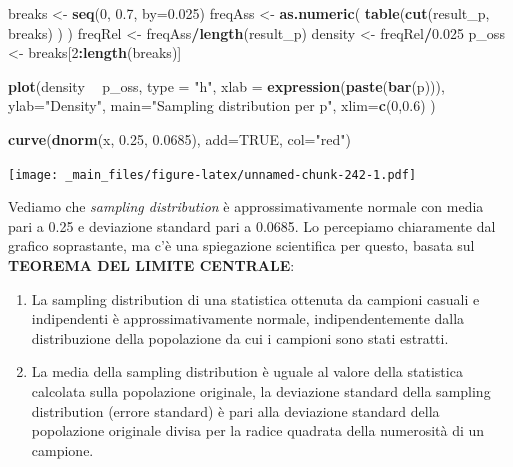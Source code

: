 \documentclass[a4paper,12pt,oneside]{book}
\providecommand{\tightlist}{%
  \setlength{\itemsep}{0pt}\setlength{\parskip}{0pt}}
\newenvironment{Shaded}{\begin{snugshade}}{\end{snugshade}}
\newcommand{\KeywordTok}[1]{\textcolor[rgb]{0.13,0.29,0.53}{\textbf{#1}}}
\newcommand{\DataTypeTok}[1]{\textcolor[rgb]{0.13,0.29,0.53}{#1}}
\newcommand{\DecValTok}[1]{\textcolor[rgb]{0.00,0.00,0.81}{#1}}
\newcommand{\FloatTok}[1]{\textcolor[rgb]{0.00,0.00,0.81}{#1}}
\newcommand{\StringTok}[1]{\textcolor[rgb]{0.31,0.60,0.02}{#1}}
\newcommand{\OtherTok}[1]{\textcolor[rgb]{0.56,0.35,0.01}{#1}}
\newcommand{\OperatorTok}[1]{\textcolor[rgb]{0.81,0.36,0.00}{\textbf{#1}}}
\newcommand{\NormalTok}[1]{#1}
\theoremstyle{definition}
\theoremstyle{definition}
\theoremstyle{definition}
\theoremstyle{remark}
\begin{document}
\begin{Shaded}
\begin{Highlighting}[]
\NormalTok{breaks <-}\StringTok{ }\KeywordTok{seq}\NormalTok{(}\DecValTok{0}\NormalTok{, }\FloatTok{0.7}\NormalTok{, }\DataTypeTok{by=}\FloatTok{0.025}\NormalTok{)}
\NormalTok{freqAss <-}\StringTok{ }\KeywordTok{as.numeric}\NormalTok{( }\KeywordTok{table}\NormalTok{(}\KeywordTok{cut}\NormalTok{(result_p, breaks) ) ) }
\NormalTok{freqRel <-}\StringTok{ }\NormalTok{freqAss}\OperatorTok{/}\KeywordTok{length}\NormalTok{(result_p)}
\NormalTok{density <-}\StringTok{ }\NormalTok{freqRel}\OperatorTok{/}\FloatTok{0.025}
\NormalTok{p_oss <-}\StringTok{ }\NormalTok{breaks[}\DecValTok{2}\OperatorTok{:}\KeywordTok{length}\NormalTok{(breaks)]}

\KeywordTok{plot}\NormalTok{(density }\OperatorTok{~}\StringTok{ }\NormalTok{p_oss, }\DataTypeTok{type =} \StringTok{"h"}\NormalTok{,}
     \DataTypeTok{xlab =} \KeywordTok{expression}\NormalTok{(}\KeywordTok{paste}\NormalTok{(}\KeywordTok{bar}\NormalTok{(p))),}
     \DataTypeTok{ylab=}\StringTok{"Density"}\NormalTok{, }
    \DataTypeTok{main=}\StringTok{"Sampling distribution per p"}\NormalTok{, }
    \DataTypeTok{xlim=}\KeywordTok{c}\NormalTok{(}\DecValTok{0}\NormalTok{,}\FloatTok{0.6}\NormalTok{) )}

\KeywordTok{curve}\NormalTok{(}\KeywordTok{dnorm}\NormalTok{(x, }\FloatTok{0.25}\NormalTok{, }\FloatTok{0.0685}\NormalTok{), }\DataTypeTok{add=}\OtherTok{TRUE}\NormalTok{, }\DataTypeTok{col=}\StringTok{"red"}\NormalTok{)}
\end{Highlighting}
\end{Shaded}

\texttt{[image: \_main\_files/figure-latex/unnamed-chunk-242-1.pdf]}

Vediamo che \emph{sampling distribution} è approssimativamente normale
con media pari a 0.25 e deviazione standard pari a 0.0685. Lo percepiamo
chiaramente dal grafico soprastante, ma c'è una spiegazione scientifica
per questo, basata sul \textbf{TEOREMA DEL LIMITE CENTRALE}:

\begin{enumerate}
\def\labelenumi{\arabic{enumi}.}
\tightlist
\item
  La sampling distribution di una statistica ottenuta da campioni
  casuali e indipendenti è approssimativamente normale,
  indipendentemente dalla distribuzione della popolazione da cui i
  campioni sono stati estratti.
\item
  La media della sampling distribution è uguale al valore della
  statistica calcolata sulla popolazione originale, la deviazione
  standard della sampling distribution (errore standard) è pari alla
  deviazione standard della popolazione originale divisa per la radice
  quadrata della numerosità di un campione.
\end{enumerate}
\end{document}

